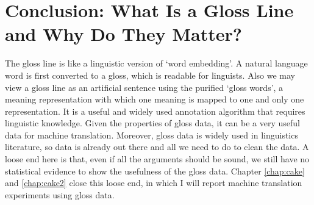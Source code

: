 \documentclass[final]{ua-thesis}
\begin{document}
\section{Conclusion: What Is a Gloss Line and Why Do They Matter?} 
The gloss line is like a linguistic version of `word embedding'. A natural language word is first converted to a gloss, which is readable for linguists. 
Also we may view a gloss line as an artificial sentence using the purified `gloss words', a meaning representation with which one meaning is mapped to one and only one representation. It is a useful and widely used annotation algorithm that requires linguistic knowledge. Given the properties of gloss data, it can be a very useful data for machine translation. Moreover, gloss data is widely used in linguistics literature, so data is already out there and all we need to do to clean the data.
A loose end here is that, even if all the arguments should be sound, we still have no statistical evidence to show the usefulness of the gloss data. Chapter \ref{chap:cake} and \ref{chap:cake2} close this loose end, in which I will report machine translation experiments using gloss data.  





\end{document}
